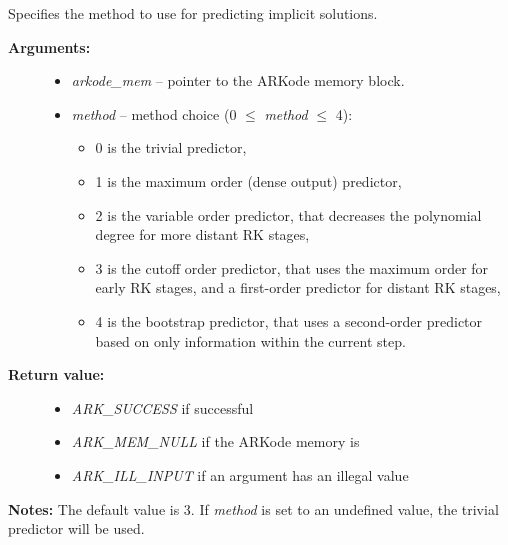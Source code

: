 \documentclass[letterpaper,10pt,english]{sphinxmanual}
\begin{document}
\begin{fulllineitems}
\label{c_interface/User_callable:c.ARKodeSetPredictorMethod}
Specifies the method to use for predicting implicit solutions.
\begin{description}
\item[{\textbf{Arguments:}}] \leavevmode\begin{itemize}
\item {} 
\emph{arkode\_mem} -- pointer to the ARKode memory block.

\item {} 
\emph{method} -- method choice (0 \(\le\) \emph{method} \(\le\) 4):
\begin{itemize}
\item {} 
0 is the trivial predictor,

\item {} 
1 is the maximum order (dense output) predictor,

\item {} 
2 is the variable order predictor, that decreases the
polynomial degree for more distant RK stages,

\item {} 
3 is the cutoff order predictor, that uses the maximum order
for early RK stages, and a first-order predictor for distant
RK stages,

\item {} 
4 is the bootstrap predictor, that uses a second-order
predictor based on only information within the current step.

\end{itemize}

\end{itemize}

\item[{\textbf{Return value:}}] \leavevmode\begin{itemize}
\item {} 
\emph{ARK\_SUCCESS} if successful

\item {} 
\emph{ARK\_MEM\_NULL} if the ARKode memory is 

\item {} 
\emph{ARK\_ILL\_INPUT} if an argument has an illegal value

\end{itemize}

\end{description}

\textbf{Notes:} The default value is 3.  If \emph{method} is set to an
undefined value, the trivial predictor will be used.

\end{fulllineitems}
\end{document}
